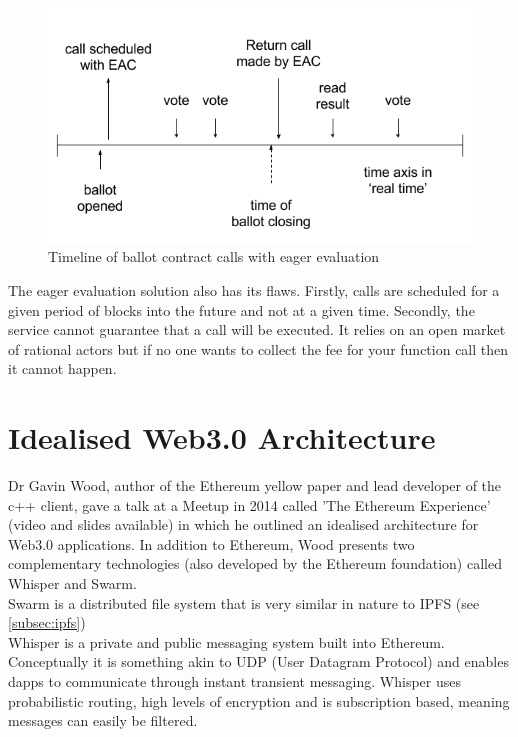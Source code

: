 \begin{figure}
\centering
\includegraphics[width=\textwidth]{Figures/eager}
\decoRule
\caption[]{Timeline of ballot contract calls with eager evaluation}
\label{fig:eager}
\end{figure}
The eager evaluation solution also has its flaws. Firstly, calls are scheduled for a given period of blocks into the future and not at a given time. Secondly, the service cannot guarantee that a call will be executed. It relies on an open market of rational actors but if no one wants to collect the fee for your function call then it cannot happen.\\

\section{Idealised Web3.0 Architecture}
\label{sec:web3Arch}
Dr Gavin Wood, author of the Ethereum yellow paper\cite{Yellowpaper} and lead developer of the c++ client, gave a talk at a Meetup in 2014 called 'The Ethereum Experience' (video\cite{Web3Vid} and slides\cite{Web3Slides} available) in which he outlined an idealised architecture for Web3.0 applications. In addition to Ethereum, Wood presents two complementary technologies (also developed by the Ethereum foundation) called Whisper and Swarm.\\ 

Swarm is a distributed file system that is very similar in nature to IPFS (see \ref{subsec:ipfs})\\

Whisper is a private and public messaging system built into Ethereum. Conceptually it is something akin to UDP (User Datagram Protocol) and enables dapps to communicate through instant transient messaging. Whisper uses probabilistic routing, high levels of encryption and is subscription based, meaning messages can easily be filtered.\\

